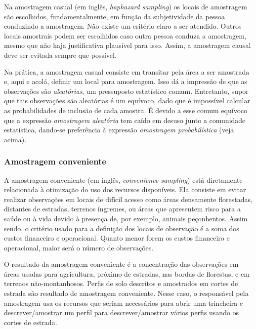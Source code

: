 \documentclass[]{book}
\begin{document}
Na amostragem casual (em inglês, \emph{haphazard sampling}) os locais de
amostragem são escolhidos, fundamentalmente, em função da subjetividade
da pessoa conduzindo a amostragem. Não existe um critério claro a ser
atendido. Outros locais amostrais podem ser escolhidos caso outra pessoa
conduza a amostragem, mesmo que não haja justificativa plausível para
isso. Assim, a amostragem causal deve ser evitada sempre que possível.

Na prática, a amostragem casual consiste em transitar pela área a ser
amostrada e, aqui e acolá, definir um local para amostragem. Isso dá a
impressão de que as observações são \emph{aleatórias}, um pressuposto
estatístico comum. Entretanto, supor que tais observações são aleatórias
é um equívoco, dado que é impossível calcular as probabilidades de
inclusão de cada amostra. É devido a esse comum equívoco que a expressão
\emph{amostragem aleatória} tem caído em desuso junto a comunidade
estatística, dando-se preferência à expressão \emph{amostragem
probabilística} (veja acima).

\subsubsection{Amostragem conveniente}\label{amostragem-conveniente}

A amostragem conveniente (em inglês, \emph{convenience sampling}) está
diretamente relacionada à otimização do uso dos recursos disponíveis.
Ela consiste em evitar realizar observações em locais de difícil acesso
como áreas densamente florestadas, distantes de estradas, terrenos
íngremes, ou áreas que apresentem risco para a saúde ou à vida devido à
presença de, por exemplo, animais peçonhentos. Assim sendo, o critério
usado para a definição dos locais de observação é a soma dos custos
financeiro e operacional. Quanto menor forem os custos financeiro e
operacional, maior será o número de observações.

O resultado da amostragem conveniente é a concentração das observações
em áreas usadas para agricultura, próximo de estradas, nas bordas de
florestas, e em terrenos não-montanhosos. Perfis de solo descritos e
amostrados em cortes de estrada são resultado de amostragem conveniente.
Nesse caso, o responsável pela amostragem usa os recursos que seriam
necessários para abrir uma trincheira e descrever/amostrar um perfil
para descrever/amostrar vários perfis usando os cortes de estrada.
\end{document}

